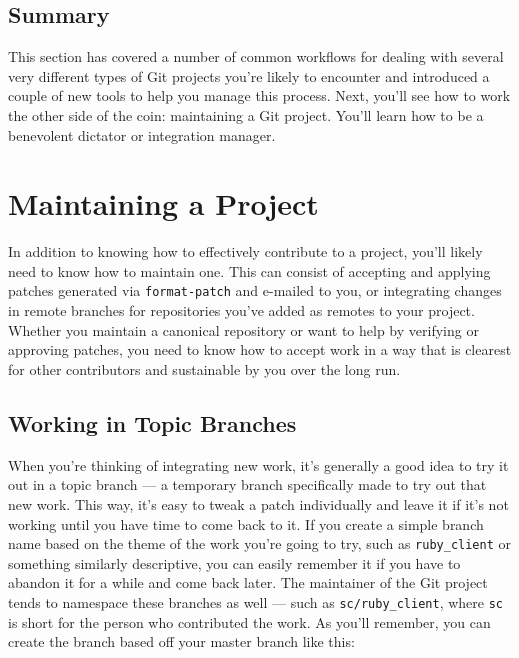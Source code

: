 \documentclass[a4paper]{book}
\begin{document}
\subsection{Summary}\label{summary-4}

This section has covered a number of common workflows for dealing with several very different types of Git projects you're likely to encounter and introduced a couple of new tools to help you manage this process. Next, you'll see how to work the other side of the coin: maintaining a Git project. You'll learn how to be a benevolent dictator or integration manager.

\section{Maintaining a Project}\label{maintaining-a-project}

In addition to knowing how to effectively contribute to a project, you'll likely need to know how to maintain one. This can consist of accepting and applying patches generated via \texttt{format-patch} and e-mailed to you, or integrating changes in remote branches for repositories you've added as remotes to your project. Whether you maintain a canonical repository or want to help by verifying or approving patches, you need to know how to accept work in a way that is clearest for other contributors and sustainable by you over the long run.

\subsection{Working in Topic Branches}\label{working-in-topic-branches}

When you're thinking of integrating new work, it's generally a good idea to try it out in a topic branch --- a temporary branch specifically made to try out that new work. This way, it's easy to tweak a patch individually and leave it if it's not working until you have time to come back to it. If you create a simple branch name based on the theme of the work you're going to try, such as \texttt{ruby\_client} or something similarly descriptive, you can easily remember it if you have to abandon it for a while and come back later. The maintainer of the Git project tends to namespace these branches as well --- such as \texttt{sc/ruby\_client}, where \texttt{sc} is short for the person who contributed the work. As you'll remember, you can create the branch based off your master branch like this:
\end{document}
